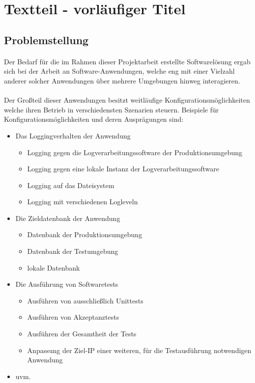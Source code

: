 \section{Textteil - vorläufiger Titel} \label{Textteil}
\subsection{Problemstellung}
\paragraph{}
Der Bedarf für die im Rahmen dieser Projektarbeit erstellte Softwarelösung ergab
sich bei der Arbeit an Software-Anwendungen, welche eng mit einer Vielzahl
anderer solcher Anwendungen über mehrere Umgebungen hinweg interagieren.

\paragraph{}
Der Großteil dieser Anwendungen besitzt weitläufige Konfigurationsmöglichkeiten
welche ihren Betrieb in verschiedensten Szenarien steuern. Beispiele für
Konfigurationsmöglichkeiten und deren Ausprägungen sind:

\begin{itemize}
    \item Das Loggingverhalten der Anwendung
          \begin{itemize}
              \item Logging gegen die Logverarbeitungssoftware der Produktionsumgebung
              \item Logging gegen eine lokale Instanz der Logverarbeitungssoftware
              \item Logging auf das Dateisystem
              \item Logging mit verschiedenen Logleveln
          \end{itemize}
    \item Die Zieldatenbank der Anwendung \begin{itemize}
              \item Datenbank der Produktionsumgebung
              \item Datenbank der Testumgebung
              \item lokale Datenbank
          \end{itemize}
    \item Die Ausführung von Softwaretests \begin{itemize}
              \item Ausführen von ausschließlich Unittests
              \item Ausführen von Akzeptanztests
              \item Ausführen der Gesamtheit der Tests
              \item Anpassung der Ziel-IP einer weiteren, für die Testausführung
                    notwendigen Anwendung
          \end{itemize}
    \item uvm.
\end{itemize}

